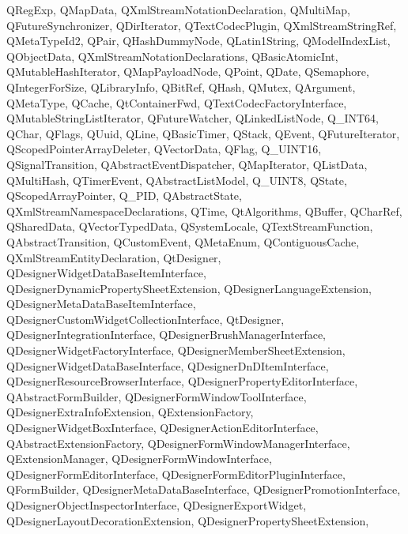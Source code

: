 {{    QRegExp,%
    QMapData,%
    QXmlStreamNotationDeclaration,%
    QMultiMap,%
    QFutureSynchronizer,%
    QDirIterator,%
    QTextCodecPlugin,%
    QXmlStreamStringRef,%
    QMetaTypeId2,%
    QPair,%
    QHashDummyNode,%
    QLatin1String,%
    QModelIndexList,%
    QObjectData,%
    QXmlStreamNotationDeclarations,%
    QBasicAtomicInt,%
    QMutableHashIterator,%
    QMapPayloadNode,%
    QPoint,%
    QDate,%
    QSemaphore,%
    QIntegerForSize,%
    QLibraryInfo,%
    QBitRef,%
    QHash,%
    QMutex,%
    QArgument,%
    QMetaType,%
    QCache,%
    QtContainerFwd,%
    QTextCodecFactoryInterface,%
    QMutableStringListIterator,%
    QFutureWatcher,%
    QLinkedListNode,%
    Q_INT64,%
    QChar,%
    QFlags,%
    QUuid,%
    QLine,%
    QBasicTimer,%
    QStack,%
    QEvent,%
    QFutureIterator,%
    QScopedPointerArrayDeleter,%
    QVectorData,%
    QFlag,%
    Q_UINT16,%
    QSignalTransition,%
    QAbstractEventDispatcher,%
    QMapIterator,%
    QListData,%
    QMultiHash,%
    QTimerEvent,%
    QAbstractListModel,%
    Q_UINT8,%
    QState,%
    QScopedArrayPointer,%
    Q_PID,%
    QAbstractState,%
    QXmlStreamNamespaceDeclarations,%
    QTime,%
    QtAlgorithms,%
    QBuffer,%
    QCharRef,%
    QSharedData,%
    QVectorTypedData,%
    QSystemLocale,%
    QTextStreamFunction,%
    QAbstractTransition,%
    QCustomEvent,%
    QMetaEnum,%
    QContiguousCache,%
    QXmlStreamEntityDeclaration,%
    QtDesigner,%
    QDesignerWidgetDataBaseItemInterface,%
    QDesignerDynamicPropertySheetExtension,%
    QDesignerLanguageExtension,%
    QDesignerMetaDataBaseItemInterface,%
    QDesignerCustomWidgetCollectionInterface,%
    QtDesigner,%
    QDesignerIntegrationInterface,%
    QDesignerBrushManagerInterface,%
    QDesignerWidgetFactoryInterface,%
    QDesignerMemberSheetExtension,%
    QDesignerWidgetDataBaseInterface,%
    QDesignerDnDItemInterface,%
    QDesignerResourceBrowserInterface,%
    QDesignerPropertyEditorInterface,%
    QAbstractFormBuilder,%
    QDesignerFormWindowToolInterface,%
    QDesignerExtraInfoExtension,%
    QExtensionFactory,%
    QDesignerWidgetBoxInterface,%
    QDesignerActionEditorInterface,%
    QAbstractExtensionFactory,%
    QDesignerFormWindowManagerInterface,%
    QExtensionManager,%
    QDesignerFormWindowInterface,%
    QDesignerFormEditorInterface,%
    QDesignerFormEditorPluginInterface,%
    QFormBuilder,%
    QDesignerMetaDataBaseInterface,%
    QDesignerPromotionInterface,%
    QDesignerObjectInspectorInterface,%
    QDesignerExportWidget,%
    QDesignerLayoutDecorationExtension,%
    QDesignerPropertySheetExtension,%
}}
